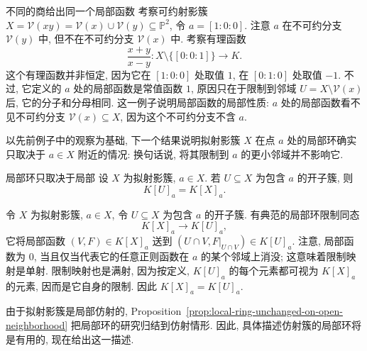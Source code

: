\begin{Example}{不同的商给出同一个局部函数}\leavevmode\label{ex:local-function-does-not-see-other-irreducible-component}
考察可约射影簇 $X=\mathcal{V}(xy)=\mathcal{V}(x)\cup\mathcal{V}(y)\subseteq\mathbb{P}^{2}$, 令 $a=[1:0:0]$. 注意 $a$ 在不可约分支 $\mathcal{V}(y)$ 中, 但不在不可约分支 $\mathcal{V}(x)$ 中. 考察有理函数
\[
  \frac{x+y}{x-y}:X\setminus\{[0:0:1]\}\to K.
\]
这个有理函数并非恒定, 因为它在 $[1:0:0]$ 处取值 $1$, 在 $[0:1:0]$ 处取值 $-1$. 不过, 它定义的 $a$ 处的局部函数是常值函数 $1$, 原因只在于限制到邻域 $U=X\setminus\mathcal{V}(x)$ 后, 它的分子和分母相同. 这一例子说明局部函数的局部性质: $a$ 处的局部函数\textquotedbl{}看不见\textquotedbl{}不可约分支 $\mathcal{V}(x)\subseteq X$, 因为这个不可约分支不含 $a$.
\end{Example}

以先前例子中的观察为基础, 下一个结果说明拟射影簇 $X$ 在点 $a$ 处的局部环确实只取决于 $a\in X$ 附近的情况: 换句话说, 将其限制到 $a$ 的更小邻域并不影响它.

\begin{Proposition}{局部环只取决于局部}\leavevmode\label{prop:local-ring-unchanged-on-open-neighborhood}
设 $X$ 为拟射影簇, $a\in X$. 若 $U\subseteq X$ 为包含 $a$ 的开子簇, 则
\[
  K[U]_{a}=K[X]_{a}.
\]
\end{Proposition}
\begin{Proof}
令 $X$ 为拟射影簇, $a\in X$, 令 $U\subseteq X$ 为包含 $a$ 的开子簇. 有典范的局部环限制同态
\[
  K[X]_{a}\to K[U]_{a},
\]
它将局部函数 $(V,F)\in K[X]_{a}$ 送到 $(U\cap V,F|_{U\cap V})\in K[U]_{a}$. 注意, 局部函数为 $0$, 当且仅当代表它的任意正则函数在 $a$ 的某个邻域上消没; 这意味着限制映射是单射. 限制映射也是满射, 因为按定义, $K[U]_{a}$ 的每个元素都可视为 $K[X]_{a}$ 的元素, 因而是它自身的限制. 因此 $K[X]_{a}=K[U]_{a}$.
\end{Proof}

由于拟射影簇是局部仿射的, Proposition~\ref{prop:local-ring-unchanged-on-open-neighborhood} 把局部环的研究归结到仿射情形. 因此, 具体描述仿射簇的局部环将是有用的, 现在给出这一描述.

